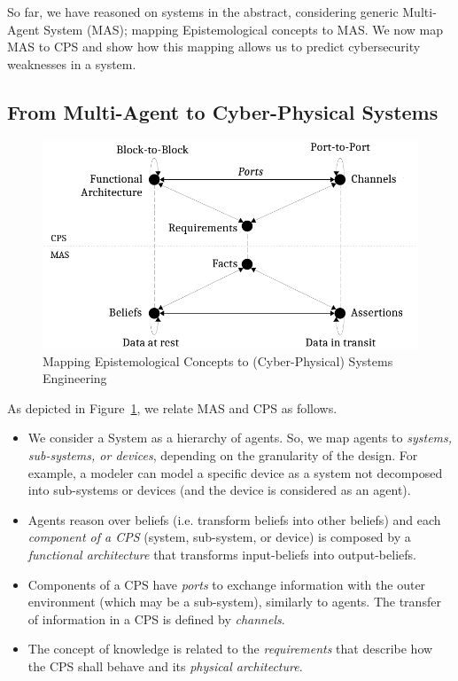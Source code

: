 \documentclass[conference]{IEEEtran}
\begin{document}
So far, we have reasoned on systems in the abstract, considering
generic Multi-Agent System (MAS); mapping Epistemological concepts
to MAS. We now map MAS to CPS and show how this mapping allows us
to predict cybersecurity weaknesses in a system.

\subsection{From Multi-Agent to Cyber-Physical Systems}
\begin{figure}[t]
	\centering
	\includegraphics[width=\columnwidth]{abftheory.pdf} %
	\caption{Mapping Epistemological Concepts to (Cyber-Physical) Systems Engineering}
	\label{fig:mashyp}
\end{figure}

As depicted in Figure~\ref{fig:mashyp}, we relate MAS and CPS as follows.
\begin{itemize}
	\item We consider a System as a hierarchy of agents. So, we map agents
		to \emph{systems, sub-systems, or devices}, depending on the
		granularity of the design. For example, a modeler can model a
		specific device as a system not decomposed into sub-systems or devices (and
		the device is considered as an agent).
	\item Agents reason over beliefs (i.e. transform beliefs into other
		beliefs) and each \emph{component of a CPS} (system, sub-system,
		or device) is composed by a \emph{functional architecture} that
		transforms input-beliefs into output-beliefs.
	\item Components of a CPS have \emph{ports} to exchange information
		with the outer environment (which may be a sub-system),
		similarly to agents. The transfer of information in a CPS is
		defined by \emph{channels}.
	\item The concept of knowledge is related to the \emph{requirements}
		that describe how the CPS shall behave and
		its \emph{physical architecture}.

\end{itemize}
\end{document}
